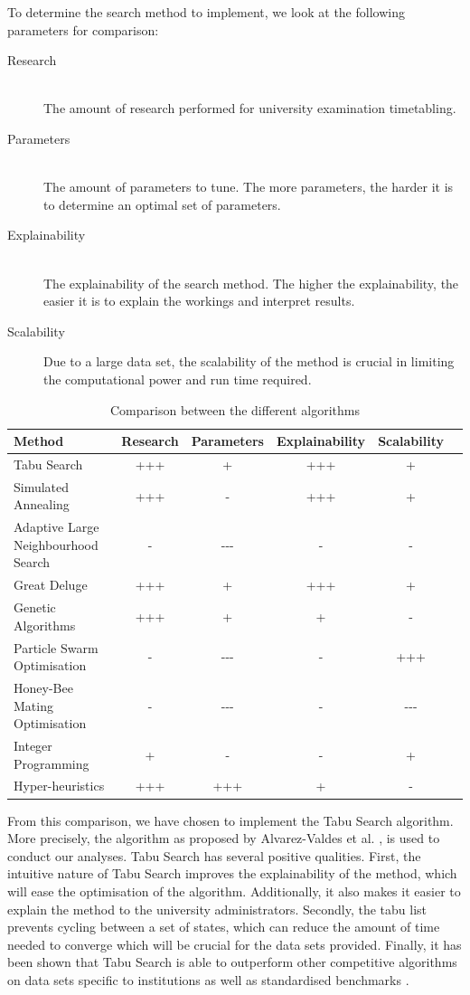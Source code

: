 To determine the search method to implement, we look at the following parameters for comparison:
\begin{description}
   \item [Research] \hfill \\ The amount of research performed for university examination timetabling. 
    \item [Parameters] \hfill \\ The amount of parameters to tune. The more parameters, the harder it is to determine an optimal set of parameters.
    \item [Explainability] \hfill \\ The explainability of the search method. The higher the explainability, the easier it is to explain the workings and interpret results.
    \item [Scalability] Due to a large data set, the scalability of the method is crucial in limiting the computational power and run time required.
\end{description}
 
\begin{table}[H]
	\caption{Comparison between the different algorithms}
	\label{tab:hbmo}
	\centering
	\begin{tabular}{l | c c c c c }
		\hline
		\textbf{Method}  & \textbf{Research} &\textbf{Parameters} &\textbf{Explainability}  & \textbf{Scalability}\\ \hline
		Tabu Search & +++ & + & +++ & +  \\
		Simulated Annealing & +++ & - & +++ & +  \\
	    Adaptive Large Neighbourhood Search &  - & -{}-{}- & - & -  \\
            Great Deluge & +++ & + & +++ & + \\
            Genetic Algorithms & +++& + & + & - \\ 
            Particle Swarm Optimisation & - & -{}-{}- & - & +++  \\ 
            Honey-Bee Mating Optimisation & - & -{}-{}-& - & -{}-{}- \\ 
            Integer Programming & + & - & - & +\\
            Hyper-heuristics & +++ & +++ & + & - \\
            \hline
	\end{tabular}
\end{table}
From this comparison, we have chosen to implement the Tabu Search algorithm. More precisely, the algorithm as proposed by Alvarez-Valdes et al. \cite{alvarez1997}, is used to conduct our analyses. Tabu Search has several positive qualities. First, the intuitive nature of Tabu Search improves the explainability of the method, which will ease the optimisation of the algorithm. Additionally, it also makes it easier to explain the method to the university administrators. Secondly, the tabu list prevents cycling between a set of states, which can reduce the amount of time needed to converge which will be crucial for the data sets provided. Finally, it has been shown that Tabu Search is able to outperform other competitive algorithms on data sets specific to institutions \cite{alvarez1997} \cite{colorni1999} \cite{Chu2000} as well as standardised benchmarks \cite{gaspero2001}.  